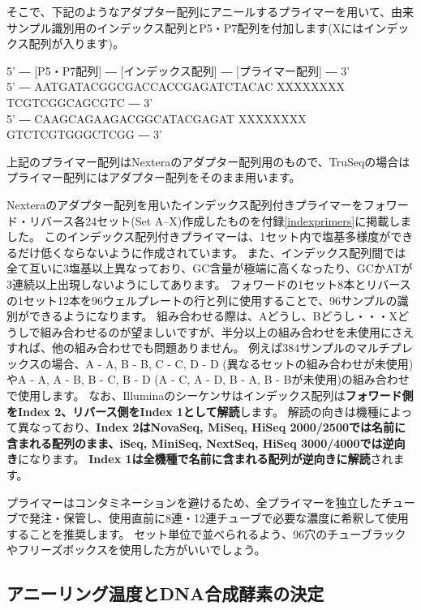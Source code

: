 \documentclass[titlepage,10pt,a4paper]{jsbook}
\newenvironment{pre}{\begin{leftbar}\raggedright\ttfamily\footnotesize\setlength{\baselineskip}{1.4em}}{\end{leftbar}\vspace{-1em}}
\begin{document}
そこで、下記のようなアダプター配列にアニールするプライマーを用いて、由来サンプル識別用のインデックス配列とP5・P7配列を付加します(Xにはインデックス配列が入ります)。

\begin{pre}
5' ― [P5・P7配列] ― [インデックス配列] ― [プライマー配列] ― 3'\\
5' ― AATGATACGGCGACCACCGAGATCTACAC XXXXXXXX TCGTCGGCAGCGTC ― 3'\\
5' ― CAAGCAGAAGACGGCATACGAGAT XXXXXXXX GTCTCGTGGGCTCGG ― 3'
\end{pre}

上記のプライマー配列はNexteraのアダプター配列用のもので、TruSeqの場合はプライマー配列にはアダプター配列をそのまま用います。

Nexteraのアダプター配列を用いたインデックス配列付きプライマーをフォワード・リバース各24セット(Set A--X)作成したものを付録\ref{indexprimers}に掲載しました。
このインデックス配列付きプライマーは、1セット内で塩基多様度ができるだけ低くならないように作成されています。
また、インデックス配列間では全て互いに3塩基以上異なっており、GC含量が極端に高くなったり、GCかATが3連続以上出現しないようにしてあります。
フォワードの1セット8本とリバースの1セット12本を96ウェルプレートの行と列に使用することで、96サンプルの識別ができるようになります。
組み合わせる際は、Aどうし、Bどうし・・・Xどうしで組み合わせるのが望ましいですが、半分以上の組み合わせを未使用にさえすれば、他の組み合わせでも問題ありません。
例えば384サンプルのマルチプレックスの場合、A - A, B - B, C - C, D - D (異なるセットの組み合わせが未使用)やA - A, A - B, B - C, B - D (A - C, A - D, B - A, B - Bが未使用)の組み合わせで使用します。
なお、Illuminaのシーケンサはインデックス配列は\textbf{フォワード側をIndex 2、リバース側をIndex 1として解読}します。
解読の向きは機種によって異なっており、\textbf{Index 2はNovaSeq, MiSeq, HiSeq 2000/2500では名前に含まれる配列のまま、iSeq, MiniSeq, NextSeq, HiSeq 3000/4000では逆向き}になります。
\textbf{Index 1は全機種で名前に含まれる配列が逆向きに解読}されます。

プライマーはコンタミネーションを避けるため、全プライマーを独立したチューブで発注・保管し、使用直前に8連・12連チューブで必要な濃度に希釈して使用することを推奨します。
セット単位で並べられるよう、96穴のチューブラックやフリーズボックスを使用した方がいいでしょう。

\subsection{アニーリング温度とDNA合成酵素の決定}
\end{document}
